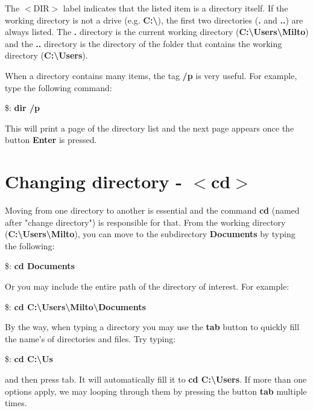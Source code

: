 \documentclass{article}
\begin{document}
	\par The  $<$DIR$>$ label indicates that the listed item is a directory itself. If the working directory is not a drive (e.g. \textbf{C:\textbackslash}), the first two directories (\textbf{.} and \textbf{..}) are always listed. The \textbf{.} directory is the current working directory (\textbf{C:\textbackslash Users\textbackslash Milto}) and the \textbf{..} directory is the directory of the folder that contains the working directory (\textbf{C:\textbackslash Users}).
	
	\par When a directory contains many items, the tag \textbf{/p} is very useful. For example, type the following command:
	\par\$:\textbf{ dir /p }
	
	\par This will print a page of the directory list and the next page appears once the button \textbf{Enter} is pressed. 
	
		
	\section{Changing directory - $<$cd$>$}
	\par Moving from one directory to another is essential and the command \textbf{cd} (named after "change directory") is responsible for that. From the working directory (\textbf{C:\textbackslash Users\textbackslash Milto}), you can move to the subdirectory \textbf{Documents} by typing the following: 
	\par \$: \textbf{cd Documents}  
	
	\par Or you may include the entire path of the directory of interest. For example:
	
	\par \$: \textbf{cd C:\textbackslash Users\textbackslash Milto\textbackslash Documents}  
	
	
	\par By the way, when typing a directory you may use the \textbf{tab} button to quickly fill the name's of directories and files. Try typing:
	
	\par \$: \textbf{cd C:\textbackslash Us}
	
	\par and then press tab. It will automatically fill it to \textbf{cd C:\textbackslash Users}. If more than one options apply, we may looping through them by pressing the button \textbf{tab} multiple times. 
	
\end{document}
